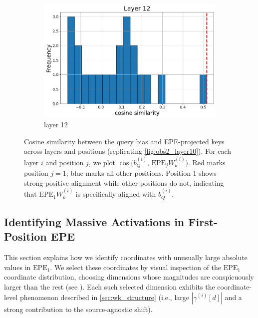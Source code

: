 \documentclass[11pt]{article}
\begin{document}
\begin{figure}[t]
\begin{subfigure}[t]{0.24\textwidth}
    \includegraphics[width=1.4\columnwidth]{figures/obs2_appendix/obs2_layer12.png}
    \caption{layer 12}
  \end{subfigure}\hfill
    \vspace{2mm}

  \caption{Cosine similarity between the query bias and EPE-projected keys across layers and positions (replicating \cref{fig:obs2_layer10}). For each layer $i$ and position $j$, we plot $\cos\big(b_Q^{(i)},\, \mathrm{EPE}_jW_k^{(i)}\big)$. Red marks position $j{=}1$; blue marks all other positions. Position 1 shows strong positive alignment while other positions do not, indicating that $\mathrm{EPE}_1W_k^{(i)}$ is specifically aligned with $b_Q^{(i)}$.}
  \label{fig:appendix_obs2_all_layers}
\end{figure}

\subsection{Identifying Massive Activations in First-Position EPE}\label{app:massive_activations_in_ppe}

This section explains how we identify coordinates with unusually large absolute values in $\mathrm{EPE}_1$. We select these coordinates by visual inspection of the $\mathrm{EPE}_1$ coordinate distribution, choosing dimensions whose magnitudes are conspicuously larger than the rest (see ). Each such selected dimension exhibits the coordinate-level phenomenon described in \cref{sec:wk_structure} (i.e., large $|\gamma^{(i)}[d]|$ and a strong contribution to the source-agnostic shift).
\end{document}
